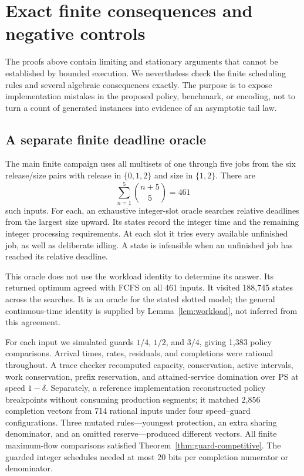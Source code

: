 \section{Exact finite consequences and negative controls}\label{sec:finite}
The proofs above contain limiting and stationary arguments that cannot be established by bounded execution. We nevertheless check the finite scheduling rules and several algebraic consequences exactly. The purpose is to expose implementation mistakes in the proposed policy, benchmark, or encoding, not to turn a count of generated instances into evidence of an asymptotic tail law.

\subsection{A separate finite deadline oracle}
The main finite campaign uses all multisets of one through five jobs from the six release/size pairs with release in $\{0,1,2\}$ and size in $\{1,2\}$. There are
\[
 \sum_{n=1}^5\binom{n+5}{5}=461
\]
such inputs. For each, an exhaustive integer-slot oracle searches relative deadlines from the largest size upward. Its states record the integer time and the remaining integer processing requirements. At each slot it tries every available unfinished job, as well as deliberate idling. A state is infeasible when an unfinished job has reached its relative deadline.

This oracle does not use the workload identity to determine its answer. Its returned optimum agreed with FCFS on all 461 inputs. It visited 188,745 states across the searches. It is an oracle for the stated slotted model; the general continuous-time identity is supplied by Lemma~\ref{lem:workload}, not inferred from this agreement.

For each input we simulated guards $1/4$, $1/2$, and $3/4$, giving 1,383 policy comparisons. Arrival times, rates, residuals, and completions were rational throughout. A trace checker recomputed capacity, conservation, active intervals, work conservation, prefix reservation, and attained-service domination over PS at speed $1-\delta$. Separately, a reference implementation reconstructed policy breakpoints without consuming production segments; it matched 2,856 completion vectors from 714 rational inputs under four speed--guard configurations. Three mutated rules---youngest protection, an extra sharing denominator, and an omitted reserve---produced different vectors. All finite maximum-flow comparisons satisfied Theorem~\ref{thm:guard-competitive}. The guarded integer schedules needed at most 20 bits per completion numerator or denominator.

